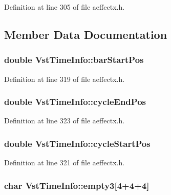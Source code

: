 Definition at line 305 of file aeffectx.\+h.



\subsection{Member Data Documentation}
\subsubsection[{\texorpdfstring{bar\+Start\+Pos}{barStartPos}}]{\setlength{\rightskip}{0pt plus 5cm}double Vst\+Time\+Info\+::bar\+Start\+Pos}\hypertarget{class_vst_time_info_a52d38a95a4c34ea3fb060388d4b412d2}{}\label{class_vst_time_info_a52d38a95a4c34ea3fb060388d4b412d2}


Definition at line 319 of file aeffectx.\+h.

\subsubsection[{\texorpdfstring{cycle\+End\+Pos}{cycleEndPos}}]{\setlength{\rightskip}{0pt plus 5cm}double Vst\+Time\+Info\+::cycle\+End\+Pos}\hypertarget{class_vst_time_info_a518833deeff87f9fbf8d0507a646470f}{}\label{class_vst_time_info_a518833deeff87f9fbf8d0507a646470f}


Definition at line 323 of file aeffectx.\+h.

\subsubsection[{\texorpdfstring{cycle\+Start\+Pos}{cycleStartPos}}]{\setlength{\rightskip}{0pt plus 5cm}double Vst\+Time\+Info\+::cycle\+Start\+Pos}\hypertarget{class_vst_time_info_a8cc34ec2d43a1cd5d86f2182373e9d9e}{}\label{class_vst_time_info_a8cc34ec2d43a1cd5d86f2182373e9d9e}


Definition at line 321 of file aeffectx.\+h.

\subsubsection[{\texorpdfstring{empty3}{empty3}}]{\setlength{\rightskip}{0pt plus 5cm}char Vst\+Time\+Info\+::empty3\mbox{[}4+4+4\mbox{]}}\hypertarget{class_vst_time_info_a74751107dc94ab06330e11b25f3bac28}{}\label{class_vst_time_info_a74751107dc94ab06330e11b25f3bac28}


